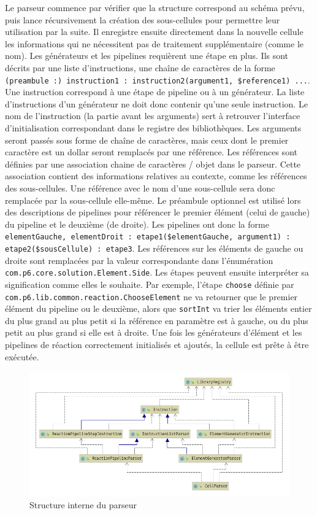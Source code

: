 \documentclass[a4paper, 12pt]{article}
\newcommand{\inline}[1]{\texttt{#1}}
\begin{document}
Le parseur commence par vérifier que la structure correspond au schéma prévu, puis lance récursivement la création des sous-cellules pour permettre leur utilisation par la suite. Il enregistre ensuite directement dans la nouvelle cellule les informations qui ne nécessitent pas de traitement supplémentaire (comme le nom).
Les générateurs et les pipelines requièrent une étape en plus. Ils sont décrits par une liste d’instructions, une chaîne de caractères de la forme \lstinline{(preambule :) instruction1 : instruction2(argument1, $reference1) ...}. Une instruction correspond à une étape de pipeline ou à un générateur. La liste d’instructions d’un générateur ne doit donc contenir qu’une seule instruction. Le nom de l’instruction (la partie avant les arguments) sert à retrouver l’interface d’initialisation correspondant dans le registre des bibliothèques. Les arguments seront passés sous forme de chaîne de caractères, mais ceux dont le premier caractère est un dollar seront remplacés par une référence. Les références sont définies par une association chaine de caractères / objet dans le parseur. Cette association contient des informations relatives au contexte, comme les références des sous-cellules. Une référence avec le nom d’une sous-cellule sera donc remplacée par la sous-cellule elle-même.
Le préambule optionnel est utilisé lors des descriptions de pipelines pour référencer le premier élément (celui de gauche) du pipeline et le deuxième (de droite). Les pipelines ont donc la forme \lstinline{elementGauche, elementDroit : etape1($elementGauche, argument1) : etape2($sousCellule) : etape3}. Les références sur les éléments de gauche ou droite sont remplacées par la valeur correspondante dans l’énumération \inline{com.p6.core.solution.Element.Side}. Les étapes peuvent ensuite interpréter sa signification comme elles le souhaite. Par exemple, l’étape \inline{choose} définie par \inline{com.p6.lib.common.reaction.ChooseElement} ne va retourner que le premier élément du pipeline ou le deuxième, alors que \inline{sortInt} va trier les éléments entier du plus grand au plus petit si la référence en paramètre est à gauche, ou du plus petit au plus grand si elle est à droite.
Une fois les générateurs d’élément et les pipelines de réaction correctement initialisés et ajoutés, la cellule est prête à être exécutée.

\begin{figure}[!ht]
  \centering
  \includegraphics[scale=0.6]{./img/Parser.png}
  \caption{Structure interne du parseur}
\end{figure}
\end{document}
